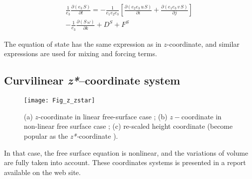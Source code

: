 \documentclass[../main/NEMO_manual]{subfiles}
\begin{document}
\begin{multline*}
  \frac{1}{e_3} \frac{\partial \left(  e_3\,S  \right) }{\partial t}=
  -\frac{1}{e_1 e_2 e_3 }\left[ {\frac{\partial \left( {e_2 e_3\,u\,S} \right)}{\partial i}
      +\frac{\partial \left( {e_1 e_3\,v\,S} \right)}{\partial j}} \right]    \\
  -\frac{1}{e_3 }\frac{\partial \left( {S\,\omega } \right)}{\partial k}     + D^S + F^S   \qquad
\end{multline*}

The equation of state has the same expression as in $z$-coordinate,
and similar expressions are used for mixing and forcing terms.




\subsection{Curvilinear \textit{z*}--coordinate system}
\label{subsec:PE_zco_star}

\begin{figure}[!b]
  \begin{center}
    \texttt{[image: Fig\_z\_zstar]}
    \caption{	\protect\label{fig:z_zstar}
      (a) $z$-coordinate in linear free-surface case ;
      (b) $z-$coordinate in non-linear free surface case ;
      (c) re-scaled height coordinate (become popular as the \textit{z*-}coordinate
      \citep{Adcroft_Campin_OM04} ).
    }
  \end{center}
\end{figure}


In that case, the free surface equation is nonlinear, and the variations of volume are fully taken into account.
These coordinates systems is presented in a report \citep{Levier2007} available on the \NEMO web site. 
\end{document}
